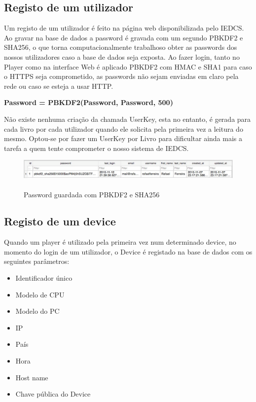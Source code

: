 \documentclass[pdftex,12pt,a4paper]{report}
\begin{document}
\subsection{Registo de um utilizador}

Um registo de um utilizador é feito na página web disponibilizada pelo IEDCS. Ao gravar na base de dados a password é gravada com um segundo PBKDF2 e SHA256, o que torna computacionalmente trabalhoso obter as passwords dos nossos utilizadores caso a base de dados seja exposta. Ao fazer login, tanto no Player como na interface Web é aplicado PBKDF2 com HMAC e SHA1 para caso o HTTPS seja comprometido, as passwords não sejam enviadas em claro pela rede ou  caso se esteja a usar HTTP.

\begin{center}
	\textbf{Password = PBKDF2(Password, Password, 500)}
\end{center}

Não existe nenhuma criação da chamada UserKey, esta no entanto, é gerada para cada livro por cada utilizador quando ele solicita pela primeira vez a leitura do mesmo. Optou-se por fazer um UserKey por Livro para dificultar ainda mais a tarefa a quem tente comprometer o nosso sistema de IEDCS.

\begin{figure}[!htb]
\center
 \includegraphics[width=150mm,scale=1]{pbkdf2_saved.pdf}
 \caption{\\Password guardada com PBKDF2 e SHA256}
 \label{fig:eer}
\end{figure}

\subsection{Registo de um device}
Quando um player é utilizado pela primeira vez num determinado device, no momento do login de um utilizador, o Device é registado na base de dados com os seguintes parâmetros:

\begin{itemize}
\item Identificador único
\item Modelo de CPU
\item Modelo do PC
\item IP
\item País
\item Hora
\item Host name
\item Chave pública do Device
\end{itemize}
\end{document}
